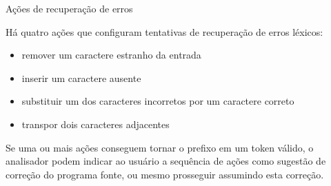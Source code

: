 \begin{frame}[fragile]{Ações de recuperação de erros}

    Há quatro ações que configuram tentativas de recuperação de erros léxicos:
    \begin{itemize}
        \item remover um caractere estranho da entrada

        \item inserir um caractere ausente

        \item substituir um dos caracteres incorretos por um caractere correto

        \item transpor dois caracteres adjacentes
    \end{itemize}

    \vspace{0.2in}

    Se uma ou mais ações conseguem tornar o prefixo em um token válido, o analisador podem indicar ao usuário a sequência de ações como sugestão de correção do
    programa fonte, ou mesmo prosseguir assumindo esta correção.
\end{frame}
